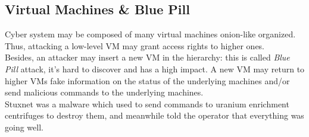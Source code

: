 \subsection*{Virtual Machines \& Blue Pill}
Cyber system may be composed of many virtual machines onion-like organized.
Thus, attacking a low-level VM may grant access rights to higher ones.\\
Besides, an attacker may insert a new VM in the hierarchy:
this is called \textit{Blue Pill} attack, it's hard to discover and has a high impact.
A new VM may return to higher VMs fake information on the status of the underlying machines and/or send malicious commands to the underlying machines.\\
Stuxnet was a malware which used to send commands to uranium enrichment centrifuges to destroy them, and meanwhile told the operator that everything was going well.  
